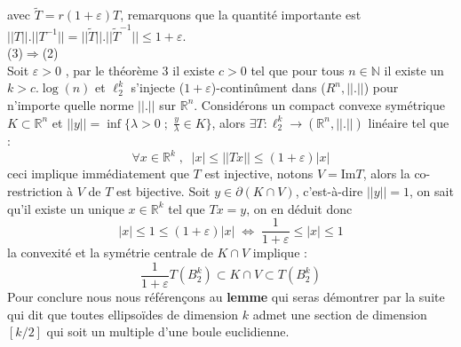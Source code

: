 \documentclass[12pt]{article}
\theoremstyle{definition}
\begin{document}
avec $\tilde{T} = r(1+\varepsilon)T$, remarquons que la quantité importante est $||T||.||T^{-1}||=||\tilde{T}||.||\tilde{T}^{-1}||\leq 1+\varepsilon$.\\ 
(3)$\Rightarrow$(2)\\
Soit $\varepsilon>0$ , par le théorème 3 il existe $c>0$ tel que pour tous $n\in\mathbb{N}$ il existe un $k>c.\log(n)$ et $\ell_2^k$ s'injecte ($1+\varepsilon$)-continûment dans ($R^n,||.||$) pour n’importe quelle norme $||.||$ sur $\mathbb{R}^n$. Considérons un compact convexe symétrique $K\subset \mathbb{R}^n$ et $||y||=\inf\Big\{\lambda>0\; ;\; \frac{y}{\lambda}\in K\Big\}$, alors $\exists T :\ell^{k}_2\to(\mathbb{R}^n,||.||)$ linéaire tel que :
\begin{equation*}
\forall x \in \mathbb{R}^k \; , \;\; |x|\leq ||Tx||\leq (1+\varepsilon)|x|
\end{equation*}
ceci implique immédiatement que $T$ est injective, notons $V=\text{Im}T$, alors la co-restriction à $V$ de $T$ est bijective.
Soit $y\in \partial(K\cap V)$, c'est-à-dire $||y||=1$, on sait qu'il existe un unique $x\in\mathbb{R}^k$ tel que $Tx=y$, on en déduit donc 
\begin{equation*}
|x|\leq 1 \leq (1+\varepsilon)|x|\; \iff\; \frac{1}{1+\varepsilon}\leq|x|\leq 1
\end{equation*}
la convexité et la symétrie centrale de $K\cap V$ implique :
\begin{equation*}
	\frac{1}{1+\varepsilon}T(B_2^k)\subset K\cap V \subset T(B_2^k)
\end{equation*}
Pour conclure nous nous référençons au \textbf{lemme } qui seras démontrer par la suite qui dit que toutes ellipsoïdes de dimension $k$ admet une section de dimension $[k/2]$ qui soit un multiple d'une boule euclidienne. 

\newtheorem{lemme}[lemme]{Lemme}

\newtheorem{rem}[rem]{Remarque}

\newtheorem{proposition}[proposition]{Proposition}
\end{document}
